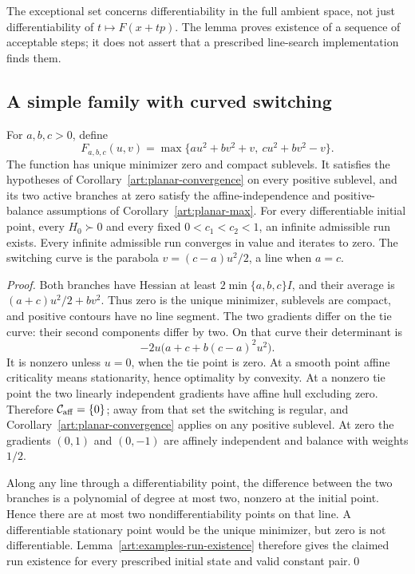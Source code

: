 The exceptional set concerns differentiability in the full ambient space,
not just differentiability of $t\mapsto F(x+tp)$. The lemma proves existence
of a sequence of acceptable steps; it does not assert that a prescribed
line-search implementation finds them.

\subsection{A simple family with curved switching}

\begin{proposition}\label{art:examples-two-quadratics}
For $a,b,c>0$, define
\[
 F_{a,b,c}(u,v)=\max\{a u^2+b v^2+v,\ c u^2+b v^2-v\}.
\]
The function has unique minimizer zero and compact sublevels. It satisfies
the hypotheses of Corollary~\ref{art:planar-convergence} on every positive
sublevel, and its two active branches at zero satisfy the affine-independence
and positive-balance assumptions of Corollary~\ref{art:planar-max}.
For every differentiable initial point, every $H_0\succ0$ and every fixed
$0<c_1<c_2<1$, an infinite admissible run exists. Every infinite admissible
run converges in value and iterates to zero. The switching curve is the
parabola $v=(c-a)u^2/2$, a line when $a=c$.
\end{proposition}
\begin{proof}
Both branches have Hessian at least $2\min\{a,b,c\}I$, and their average
is $(a+c)u^2/2+bv^2$. Thus zero is the unique minimizer, sublevels are compact,
and positive contours have no line segment. The two gradients differ on
the tie curve: their second components differ by two. On that curve their
determinant is
\[
 -2u\bigl(a+c+b(c-a)^2u^2\bigr).
\]
It is nonzero unless $u=0$, when the tie point is zero. At a smooth point
affine criticality means stationarity, hence optimality by convexity.
At a nonzero tie point the two linearly independent gradients have affine
hull excluding zero. Therefore $\mathcal C_{\rm aff}=\{0\}$; away from
that set the switching is regular, and Corollary~\ref{art:planar-convergence}
applies on any positive sublevel. At zero the gradients $(0,1)$ and $(0,-1)$
are affinely independent and balance with weights $1/2$.

Along any line through a differentiability point, the difference between
the two branches is a polynomial of degree at most two, nonzero at the
initial point. Hence there are at most two nondifferentiability points on
that line. A differentiable stationary point would be the unique minimizer,
but zero is not differentiable. Lemma~\ref{art:examples-run-existence}
therefore gives the claimed run existence for every prescribed initial
state and valid constant pair.\qed
\end{proof}

